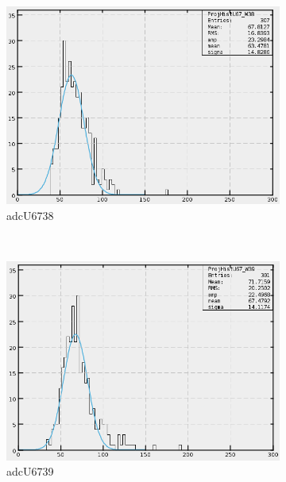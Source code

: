 \begin{figure}[h]
\begin{subfigure}[h]{0.3\textwidth}
        \includegraphics[width=\textwidth, keepaspectratio = true]{adcU67_38}
        \caption{adcU6738}
        \label{fig:adcU67_38}
    \end{subfigure}
    ~
    \begin{subfigure}[h]{0.3\textwidth}
        \centering
        \includegraphics[width=\textwidth, keepaspectratio = true]{adcU67_39}
        \caption{adcU6739}
        \label{fig:adcU67_39}
    \end{subfigure}
    ~
    \begin{subfigure}[h]{0.3\textwidth}
        \centering

\end{subfigure}
\end{figure}
